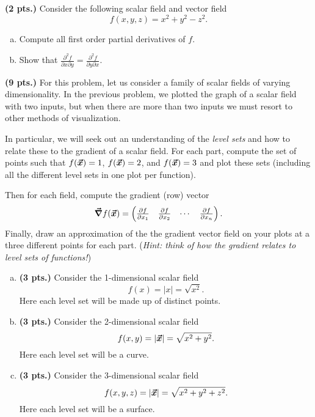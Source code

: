 \documentclass[12pt]{article} %
\begin{document}
\vspace*{0.5cm}

\begin{problem}
\textbf{(2 pts.)} Consider the following scalar field and vector field
\[
f(x,y,z) = x^2+y^2-z^2.
\]
\begin{enumerate}[(a)]
    \item Compute all first order partial derivatives of $f$.
    \item Show that $\frac{\partial^2 f}{\partial x \partial y} = \frac{\partial^2 f}{\partial y \partial x}$.
\end{enumerate}
\end{problem}

\vspace*{0.5cm}

\begin{problem}
\textbf{(9 pts.)} For this problem, let us consider a family of scalar fields of varying dimensionality. In the previous problem, we plotted the graph of a scalar field with two inputs, but when there are more than two inputs we must resort to other methods of visualization.

In particular, we will seek out an understanding of the \emph{level sets} and how to relate these to the gradient of a scalar field. For each part, compute the set of points such that $f(\boldsymbol{\vec{x}})=1$, $f(\boldsymbol{\vec{x}})=2$, and $f(\boldsymbol{\vec{x}})=3$ and plot these sets (including all the different level sets in one plot per function).

Then for each field, compute the gradient (row) vector
\[
\boldsymbol{\vec{\nabla}} f(\boldsymbol{\vec{x}}) = \begin{pmatrix} \frac{\partial f}{\partial x_1} & \frac{\partial f}{\partial x_2} & \cdots & \frac{\partial f}{\partial x_n}\end{pmatrix}.
\]
Finally, draw an approximation of the the gradient vector field on your plots at a three different points for each part. (\emph{Hint: think of how the gradient relates to level sets of functions!})
\begin{enumerate}[(a)]
	\item \textbf{(3 pts.)} Consider the 1-dimensional scalar field
	\[
	f(x) = |x| = \sqrt{x^2}.
	\]
	Here each level set will be made up of distinct points.
	\item \textbf{(3 pts.)} Consider the 2-dimensional scalar field
	\[
	f(x,y) = |\boldsymbol{\vec{x}}| = \sqrt{x^2+y^2}.
	\]
	Here each level set will be a curve.
	\item \textbf{(3 pts.)} Consider the 3-dimensional scalar field
		\[
		f(x,y,z) = |\boldsymbol{\vec{x}}| = \sqrt{x^2+y^2+z^2}.
		\]
		Here each level set will be a surface.
\end{enumerate}
\end{problem}
\end{document}
